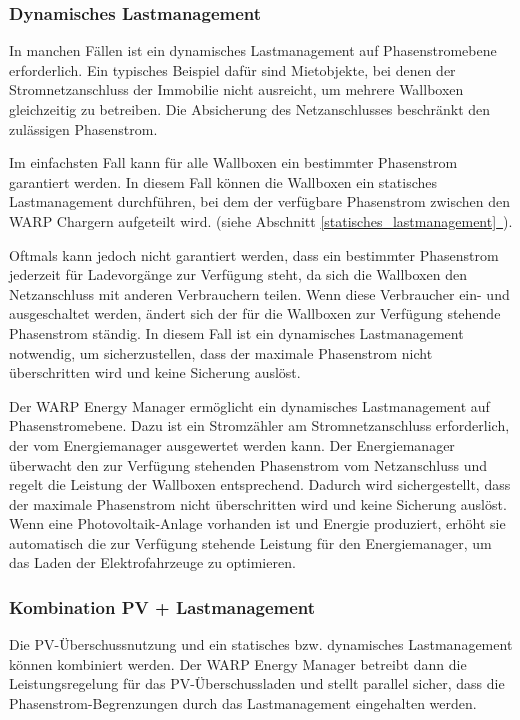 \documentclass[a4paper,10pt]{article}
\newcommand*{\fullref}[1]{Abschnitt \hyperref[{#1}]{\ref*{#1}~\nameref*{#1}}}
\begin{document}
\begin{multicols*}{2}
	\vspace{-0.05cm}
	\subsubsection{Dynamisches Lastmanagement}
	\label{dynamisches_lastmanagement}

	In manchen Fällen ist ein dynamisches Lastmanagement auf Phasenstromebene erforderlich.
	Ein typisches Beispiel dafür sind Mietobjekte, bei denen der Stromnetzanschluss der
	Immobilie nicht ausreicht, um mehrere Wallboxen gleichzeitig zu betreiben.
	Die Absicherung des Netzanschlusses beschränkt den zulässigen Phasenstrom.

	Im einfachsten Fall kann für alle Wallboxen ein bestimmter Phasenstrom garantiert werden.
	In diesem Fall können die Wallboxen ein statisches Lastmanagement durchführen,
	bei dem der verfügbare Phasenstrom zwischen den WARP Chargern aufgeteilt wird. (siehe \fullref{statisches_lastmanagement}).

	Oftmals kann jedoch nicht garantiert werden, dass ein bestimmter Phasenstrom jederzeit
	für Ladevorgänge zur Verfügung steht, da sich die Wallboxen den Netzanschluss mit anderen Verbrauchern teilen.
	Wenn diese Verbraucher ein- und ausgeschaltet werden,
	ändert sich der für die Wallboxen zur Verfügung stehende Phasenstrom
	ständig. In diesem Fall ist ein dynamisches Lastmanagement notwendig, um
	sicherzustellen, dass der maximale Phasenstrom nicht überschritten wird und
	keine Sicherung auslöst.

	Der WARP Energy Manager ermöglicht ein dynamisches Lastmanagement auf Phasenstromebene.
	Dazu ist ein Stromzähler am Stromnetzanschluss erforderlich, der vom Energiemanager
	ausgewertet werden kann. Der Energiemanager überwacht den zur Verfügung stehenden
	Phasenstrom vom Netzanschluss und regelt die Leistung der Wallboxen entsprechend.
	Dadurch wird sichergestellt, dass der maximale Phasenstrom nicht überschritten wird
	und keine Sicherung auslöst. Wenn eine Photovoltaik-Anlage vorhanden ist und Energie
	produziert, erhöht sie automatisch die zur Verfügung stehende Leistung für den
	Energiemanager, um das Laden der Elektrofahrzeuge zu optimieren.

	\subsubsection{Kombination PV + Lastmanagement}
	Die PV-Überschussnutzung und ein statisches bzw. dynamisches Lastmanagement können
	kombiniert werden. Der WARP Energy Manager betreibt dann die
	Leistungsregelung für das PV-Überschussladen und stellt parallel sicher, dass die
	Phasenstrom-Begrenzungen durch das Lastmanagement eingehalten werden.


\end{multicols*}
\end{document}
